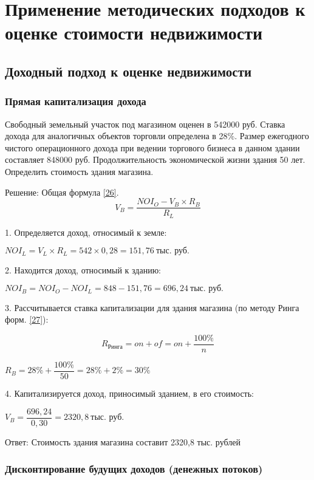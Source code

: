 \section{Применение методических подходов к оценке стоимости недвижимости}
\subsection{Доходный подход к оценке недвижимости}
\subsubsection{Прямая капитализация дохода}

Свободный земельный участок под магазином оценен в 542000 руб. 
Ставка дохода для аналогичных объектов торговли определена в 28\%.
Размер ежегодного чистого операционного дохода при ведении торгового бизнеса в данном здании составляет 848000 руб.
Продолжительность экономической жизни здания 50 лет.
Определить стоимость здания магазина.

Решение: Общая формула \ref{26}.
\begin{equation}\label{26}
V_B = \dfrac{NOI_O - V_B \times R_B}{R_L}
\end{equation}

1. Определяется доход, относимый к земле:

$ NOI_L = V_L \times R_L = 542 \times 0,28 = 151,76  \ \text{тыс. руб.}$

2. Находится доход, относимый к зданию:

$ NOI_B = NOI_O - NOI_L = 848 - 151,76 =696,24 \ \text{тыс. руб.} $

3. Рассчитывается ставка капитализации для здания магазина (по методу Ринга форм. \ref{27}):

\begin{equation}\label{27}
R_{\text{Ринга}} = on + of = on + \dfrac{100\%}{n}
\end{equation}

$ R_B = 28\% + \dfrac{100\%}{50}  = 28\% +2\% = 30\% $

4. Капитализируется доход, приносимый зданием, в его стоимость:

$ V_B = \dfrac{696,24}{0,30} = 2320,8 \ \text{тыс. руб.} $

Ответ: Стоимость здания магазина составит 2320,8 тыс. рублей

\subsubsection{Дисконтирование будущих доходов (денежных потоков)}

